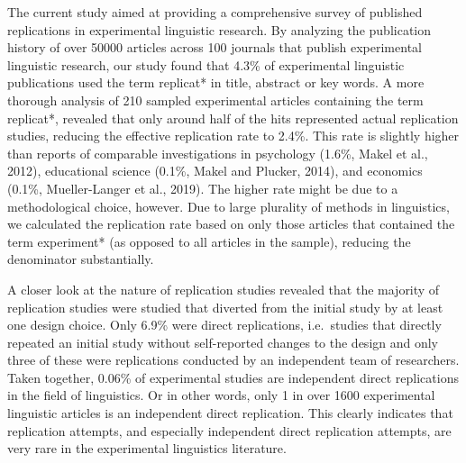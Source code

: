 \documentclass[]{elsarticle} %
\begin{document}
The current study aimed at providing a comprehensive survey of published replications in experimental linguistic research.
By analyzing the publication history of over 50000 articles across 100 journals that publish experimental linguistic research, our study found that 4.3\% of experimental linguistic publications used the term replicat* in title, abstract or key words.
A more thorough analysis of 210 sampled experimental articles containing the term replicat*, revealed that only around half of the hits represented actual replication studies, reducing the effective replication rate to 2.4\%. This rate is slightly higher than reports of comparable investigations in psychology (1.6\%, Makel et al., 2012), educational science (0.1\%, Makel and Plucker, 2014), and economics (0.1\%, Mueller-Langer et al., 2019). The higher rate might be due to a methodological choice, however. Due to large plurality of methods in linguistics, we calculated the replication rate based on only those articles that contained the term experiment* (as opposed to all articles in the sample), reducing the denominator substantially.

A closer look at the nature of replication studies revealed that the majority of replication studies were studied that diverted from the initial study by at least one design choice. Only 6.9\% were direct replications, i.e.~studies that directly repeated an initial study without self-reported changes to the design and only three of these were replications conducted by an independent team of researchers.
Taken together, 0.06\% of experimental studies are independent direct replications in the field of linguistics. Or in other words, only 1 in over 1600 experimental linguistic articles is an independent direct replication. This clearly indicates that replication attempts, and especially independent direct replication attempts, are very rare in the experimental linguistics literature.
\end{document}
